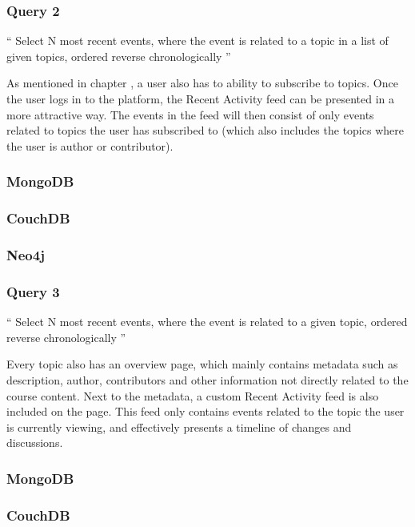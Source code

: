 \subsubsection{Query 2}
\label{subsubsec:query-2}

``
Select N most recent events, where the event is related to a topic in a list of given topics, ordered reverse chronologically
''

As mentioned in chapter , a user also has to ability to subscribe to topics.
Once the user logs in to the platform, the Recent Activity feed can be presented in a more attractive way.
The events in the feed will then consist of only events related to topics the user has subscribed to (which also includes the topics where the user is author or contributor).

\subsubsection*{MongoDB}
\subsubsection*{CouchDB}
\subsubsection*{Neo4j}

\subsubsection{Query 3}
\label{subsubsec:query-3}

``
Select N most recent events, where the event is related to a given topic, ordered reverse chronologically
''

Every topic also has an overview page, which mainly contains metadata such as description, author, contributors and other information not directly related to the course content.
Next to the metadata, a custom Recent Activity feed is also included on the page.
This feed only contains events related to the topic the user is currently viewing, and effectively presents a timeline of changes and discussions.

\subsubsection*{MongoDB}
\subsubsection*{CouchDB}
